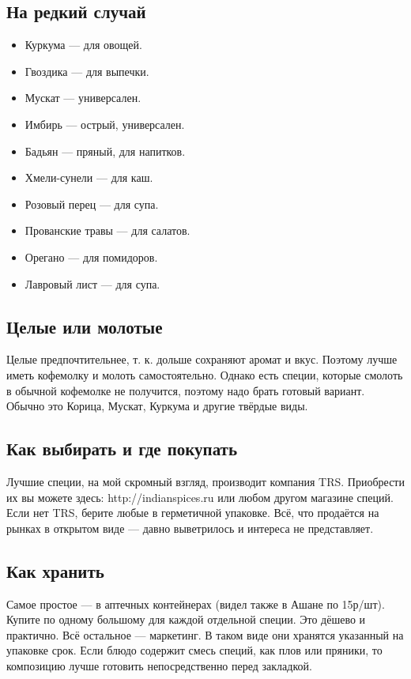 \subsection{На редкий случай}
\begin{itemize}
\item Куркума — для овощей.
\item Гвоздика — для выпечки.
\item Мускат — универсален.
\item Имбирь — острый, универсален.
\item Бадьян — пряный, для напитков.
\item Хмели-сунели — для каш.
\item Розовый перец — для супа.
\item Прованские травы — для салатов.
\item Орегано — для помидоров.
\item Лавровый лист — для супа.
\end{itemize}

\subsection{Целые или молотые}
Целые предпочтительнее, т. к. дольше сохраняют аромат и вкус. Поэтому лучше иметь кофемолку и молоть самостоятельно. Однако есть специи, которые смолоть в обычной кофемолке не получится, поэтому надо брать готовый вариант. Обычно это Корица, Мускат, Куркума и другие твёрдые виды.

\subsection{Как выбирать и где покупать}
Лучшие специи, на мой скромный взгляд, производит компания TRS. Приобрести их вы можете здесь: http://indianspices.ru или любом другом магазине специй. Если нет TRS, берите любые в герметичной упаковке. Всё, что продаётся на рынках в открытом виде — давно выветрилось и интереса не представляет.

\subsection{Как хранить}
Самое простое — в аптечных контейнерах (видел также в Ашане по 15р/шт). Купите по одному большому для каждой отдельной специи. Это дёшево и практично. Всё остальное — маркетинг. В таком виде они хранятся указанный на упаковке срок.
Если блюдо содержит смесь специй, как плов или пряники, то композицию лучше готовить непосредственно перед закладкой.

